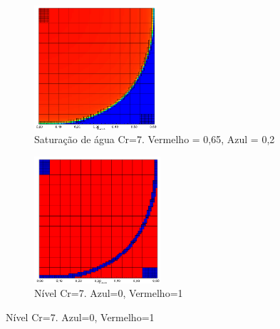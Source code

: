 \documentclass[professionalfont]{beamer}
\begin{document}
\begin{frame}{\FrameProblemName}
    \begin{figure}[!htbp]
        \centering
        \caption{Malha NU-ADM}
        \begin{subfigure}{.48\textwidth}
            \centering
            \includegraphics[height=4.6cm]{./imgs/pr4/sat_cr7.png}
            \caption{Saturação de água Cr=7. Vermelho = 0,65, Azul = 0,2}
        \end{subfigure}
        \hfill
        \begin{subfigure}{.48\textwidth}
            \centering
            \includegraphics[height=4.7cm]{./imgs/pr4/nivel_cr7.png}
            \caption{Nível Cr=7. Azul=0, Vermelho=1}
        \end{subfigure}
    
        \label{fig:fig7_pr4}
    \end{figure}
\end{frame}
\end{document}
